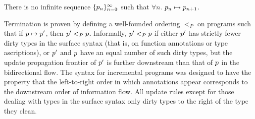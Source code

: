 \begin{theorem}[Termination]
    There is no infinite sequence $\{p_n\}_{n= 0}^\infty$ such that $\forall n$. $p_n\mapsto p_{n+1}$. 
\end{theorem}

Termination is proven by defining a well-founded ordering $<_P$ on programs such that if $p\mapsto p'$, then $p' <_P p$. Informally, $p' <_P p$ if either $p'$ has strictly fewer dirty types in the surface syntax (that is, on function annotations or type ascriptions), or $p'$ and $p$ have an equal number of such dirty types, but the update propagation frontier of $p'$ is further downstream than that of $p$ in the bidirectional flow. The syntax for incremental programs was designed to have the property that the left-to-right order in which annotations appear corresponds to the downstream order of information flow. All update rules except for those dealing with types in the surface syntax only dirty types to the right of the type they clean.
